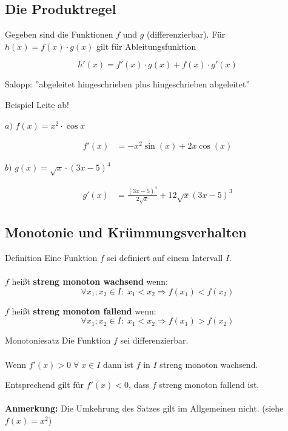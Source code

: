 \documentclass{article}
\begin{document}
\newpage

\subsection{Die Produktregel}

Gegeben sind die Funktionen $f$ und $g$ (differenzierbar). 
Für $h(x) = f(x) \cdot g(x)$ gilt für Ableitungsfunktion

\[h'(x) = f'(x) \cdot g(x) + f(x) \cdot g'(x)\]

Salopp: ''abgeleitet hingeschrieben plus hingeschrieben abgeleitet''

\begin{boxx}[DarkBlue]{Beispiel}
    Leite ab!

    $a)$\hspace{3mm} $\displaystyle f(x) = x^2 \cdot \cos x$

    \begin{align*}
        f'(x) &= -x^2\sin(x) + 2x\cos(x)
    \end{align*}

    $b)$\hspace{3mm} $\displaystyle g(x) = \sqrt{x} \cdot \left(3x-5\right)^4$

    \begin{align*}
        g'(x) &= \frac{\left(3x-5\right)^4}{2\sqrt{x}} + 12\sqrt{x}\left(3x-5\right)^3
    \end{align*}
\end{boxx}

\subsection{Monotonie und Krümmungsverhalten}
\begin{boxx}[Red]{Definition}
    Eine Funktion $f$ sei definiert auf einem Intervall $I$.
    \\\\
    $f$ heißt \textbf{streng monoton wachsend} wenn:
    \[\forall x_1;x_2 \in I: \; x_1 < x_2 \Rightarrow f\left(x_1\right)<f\left(x_2\right)\]

    $f$ heißt \textbf{streng monoton fallend} wenn: \\
    \[\forall x_1;x_2 \in I: \; x_1 < x_2 \Rightarrow f\left(x_1\right)>f\left(x_2\right)\]
\end{boxx}

\begin{boxx}[LightGreen]{Monotoniesatz}
    Die Funktion $f$ sei differenzierbar.
    \\\\
    Wenn $f'(x)>0 \; \forall \; x \in I$ dann ist $f$ in $I$ streng monoton wachsend.

    Entsprechend gilt für $f'(x)<0$, dass $f$ streng monoton fallend ist.
    \\\\
    \textbf{Anmerkung:} Die Umkehrung des Satzes gilt im Allgemeinen nicht.
    (siehe $\displaystyle f(x) = x^2$)
\end{boxx}
\end{document}
